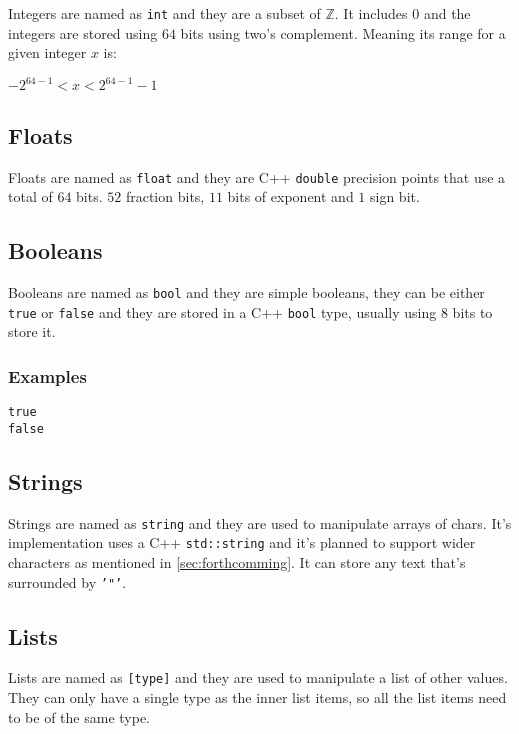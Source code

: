 Integers are named as \texttt{int} and they are a subset of $\mathbb{Z}$. It includes 0
and the integers are stored using $64$ bits using two's complement. Meaning its range for a given integer $x$ is:

\begin{center}
$-2^{64 - 1} < x < 2^{64 - 1} - 1$
\end{center}

\subsection{Floats}

Floats are named as \texttt{float} and they are C++ \texttt{double} precision points that use a total of $64$ bits. $52$ fraction bits, $11$ bits
of exponent and $1$ sign bit.

\subsection{Booleans}

Booleans are named as \texttt{bool} and they are simple booleans, they can be either \texttt{true} or \texttt{false} and they are stored in
a C++ \texttt{bool} type, usually using 8 bits to store it.

\subsubsection{Examples}

\begin{lstlisting}
true
false
\end{lstlisting}

\subsection{Strings}

Strings are named as \texttt{string} and they are used to manipulate arrays of chars. It's implementation uses
a C++ \texttt{std::string} and it's planned to support wider characters as mentioned in \autoref{sec:forthcomming}. It can store any text that's surrounded by \texttt{'"'}.

\subsection{Lists}

Lists are named as \texttt{[type]} and they are used to manipulate a list of other values. They can only have a single
type as the inner list items, so all the list items need to be of the same type.

